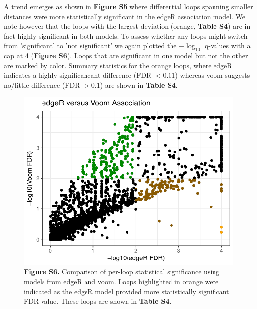 \documentclass{article}\usepackage[]{graphicx}\usepackage[]{color}
\makeatletter
\def\maxwidth{ %
  \ifdim\Gin@nat@width>\linewidth
    \linewidth
  \else
    \Gin@nat@width
  \fi
}
\newenvironment{knitrout}{}{} %
\makeatother
\begin{document}
A trend emerges as shown in \textbf{Figure S5} where differential loops spanning smaller distances were more statistically significant in the edgeR association model. We note however that the loops with the largest deviation (orange, \textbf{Table S4}) are in fact highly significant in both models. To assess whether any loops might switch from 'significant' to 'not significant' we again plotted the $-\log_{10}$ q-values with a cap at 4 (\textbf{Figure S6}). Loops that are significant in one model but not the other are marked by color. Summary statistics for the orange loops, where edgeR indicates a highly significancant difference (FDR $< 0.01$) whereas voom suggests no/little difference (FDR $> 0.1$) are shown in \textbf{Table S4}. 

\begin{figure}[h]
\begin{knitrout}
\color{fgcolor}

{\centering \includegraphics[width=\maxwidth]{figure/closeMDFvoom-1} 

}



\end{knitrout}
\centering
\caption{\textbf{Figure S6.} Comparison of per-loop statistical significance using models from edgeR and voom. Loops highlighted in orange were indicated as the edgeR model provided more statistically significant FDR value. These loops are shown in \textbf{Table S4}.}
\end{figure}
\end{document}
